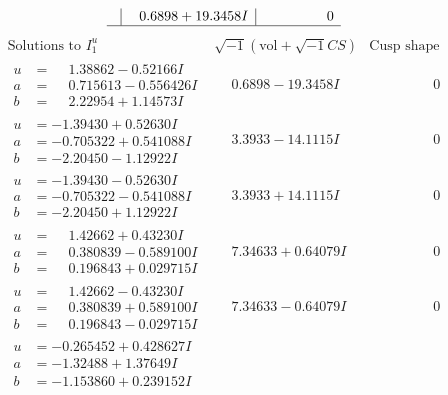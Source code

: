 \documentclass[1p]{elsarticle_modified}
\theoremstyle{definition}
\newcommand{\I}{\sqrt{-1}}
\begin{document}
$$\begin{array}{c|c|c}
 & \phantom{-}0.6898 + 19.3458 I & \phantom{-0.000000 } 0\\
 \hline 
 \end{array}$$\newpage$$\begin{array}{c|c|c}  
\text{Solutions to }I^u_{1}& \I (\text{vol} + \sqrt{-1}CS) & \text{Cusp shape}\\
 \hline 
\begin{aligned}
u &= \phantom{-}1.38862 - 0.52166 I \\
a &= \phantom{-}0.715613 - 0.556426 I \\
b &= \phantom{-}2.22954 + 1.14573 I\end{aligned}
 & \phantom{-}0.6898 - 19.3458 I & \phantom{-0.000000 } 0 \\ \hline\begin{aligned}
u &= -1.39430 + 0.52630 I \\
a &= -0.705322 + 0.541088 I \\
b &= -2.20450 - 1.12922 I\end{aligned}
 & \phantom{-}3.3933 - 14.1115 I & \phantom{-0.000000 } 0 \\ \hline\begin{aligned}
u &= -1.39430 - 0.52630 I \\
a &= -0.705322 - 0.541088 I \\
b &= -2.20450 + 1.12922 I\end{aligned}
 & \phantom{-}3.3933 + 14.1115 I & \phantom{-0.000000 } 0 \\ \hline\begin{aligned}
u &= \phantom{-}1.42662 + 0.43230 I \\
a &= \phantom{-}0.380839 - 0.589100 I \\
b &= \phantom{-}0.196843 + 0.029715 I\end{aligned}
 & \phantom{-}7.34633 + 0.64079 I & \phantom{-0.000000 } 0 \\ \hline\begin{aligned}
u &= \phantom{-}1.42662 - 0.43230 I \\
a &= \phantom{-}0.380839 + 0.589100 I \\
b &= \phantom{-}0.196843 - 0.029715 I\end{aligned}
 & \phantom{-}7.34633 - 0.64079 I & \phantom{-0.000000 } 0 \\ \hline\begin{aligned}
u &= -0.265452 + 0.428627 I \\
a &= -1.32488 + 1.37649 I \\
b &= -1.153860 + 0.239152 I\end{aligned}

\end{array}$$
\end{document}
